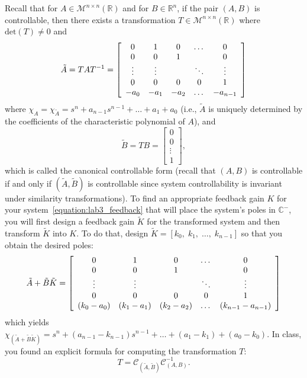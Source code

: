 Recall that for $A \in \mathcal{M}^{n \times n}(\mathbb{R})$ and for $B \in \mathbb{R}^n$, if the pair $(A,B)$ is controllable, then there exists a transformation $T \in \mathcal{M}^{n \times n}(\mathbb{R})$ where $\text{det}(T) \not = 0$ and
\[
    \tilde{A} = TAT^{-1} =
    \left[\begin{array}{c c c c c}
            0      & 1      & 0    & \dots  & 0        \\
            0      & 0      & 1    &        & 0        \\
            \vdots & \vdots &      & \ddots & \vdots   \\
            0      & 0      & 0    & 0      & 1        \\
            -a_0   & -a_1   & -a_2 & \dots  & -a_{n-1}
        \end{array}\right]
\]
where $\chi_{A} = \chi_{\tilde{A}} = s^n + a_{n-1} s^{n-1} + \dots + a_1 + a_0$ (i.e., $\tilde{A}$ is uniquely determined by the coefficients of the characteristic polynomial of $A$), and
\[
    \tilde{B} = TB =
    \left[\begin{array}{c}
            0      \\
            0      \\
            \vdots \\
            1
        \end{array}\right],
\]
which is called the canonical controllable form (recall that $(A,B)$ is controllable if and only if $(\tilde{A},\tilde{B})$ is controllable since system controllability is invariant under similarity transformations). To find an appropriate feedback gain $K$ for your system~\eqref{equation:lab3_feedback} that will place the system's poles in $\mathbb{C}^-$, you will first design a feedback gain $\tilde{K}$ for the transformed system and then transform $\tilde{K}$ into $K$. To do that, design $\tilde{K} = [k_0, \; k_1, \; \dots, \; k_{n-1}]$ so that you obtain the desired poles:
\[
    \tilde{A}+\tilde{B}\tilde{K} =
    \left[\begin{array}{c c c c  c}
            0         & 1         & 0         & \dots  & 0                 \\
            0         & 0         & 1         &        & 0                 \\
            \vdots    & \vdots    &           & \ddots & \vdots            \\
            0         & 0         & 0         & 0      & 1                 \\
            (k_0-a_0) & (k_1-a_1) & (k_2-a_2) & \dots  & (k_{n-1}-a_{n-1})
        \end{array}\right]
\]
which yields $\chi_{(\tilde{A}+\tilde{B}\tilde{K})} = s^n + (a_{n-1}-k_{n-1})s^{n-1} + \dots + (a_1 - k_1) + (a_0 - k_0)$. In class, you found an explicit formula for computing the transformation $T$:
\[
    T=\mathcal{C}_{(\tilde{A},\tilde{B})} \mathcal{C}_{(A,B)}^{-1}.
\]

